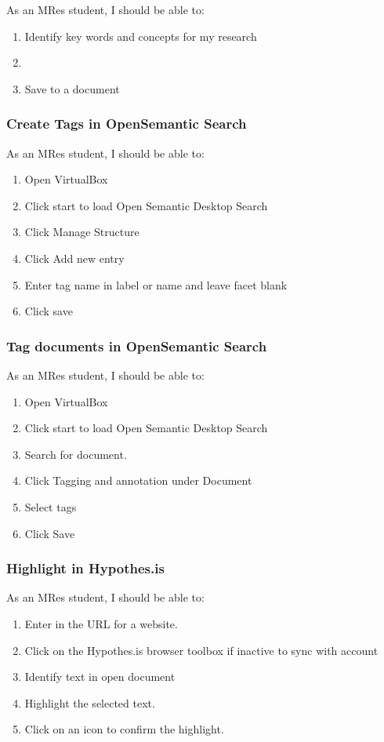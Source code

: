 \documentclass{article}
\begin{document}
As an MRes student, I should be able to:
\begin{enumerate}
\item Identify key words and concepts for my research
\item 
\item Save to a document
\end{enumerate}

\subsubsection*{Create Tags in OpenSemantic Search}

As an MRes student, I should be able to:
\begin{enumerate}
\item Open VirtualBox
\item Click start to load Open Semantic Desktop Search
\item Click Manage Structure
\item Click Add new entry
\item Enter tag name in label or name and leave facet blank
\item Click save
\end{enumerate}

\subsubsection*{Tag documents in OpenSemantic Search}

As an MRes student, I should be able to:
\begin{enumerate}
\item Open VirtualBox
\item Click start to load Open Semantic Desktop Search
\item Search for document.
\item Click Tagging and annotation under Document
\item Select tags
\item Click Save
\end{enumerate}

\subsubsection*{Highlight in Hypothes.is}

As an MRes student, I should be able to: \begin{enumerate}
\item Enter in the URL for a website.
\item Click on the Hypothes.is browser toolbox if inactive to sync with account
\item Identify text in open document
\item Highlight the selected text. 
\item Click on an icon to confirm the highlight.
\end{enumerate}
\end{document}
